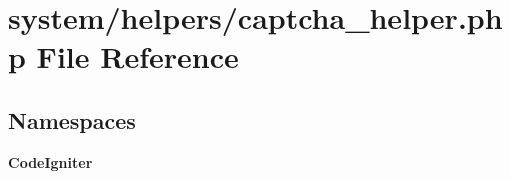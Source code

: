 \section{system/helpers/captcha\-\_\-helper.php File Reference}
\label{captcha__helper_8php}
\subsection*{Namespaces}
\begin{DoxyCompactItemize}
\item 
{\bf Code\-Igniter}
\end{DoxyCompactItemize}
